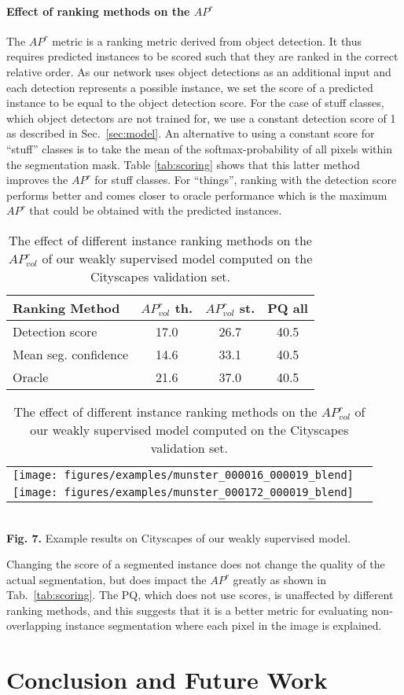 \documentclass[runningheads]{llncs}
\begin{document}
\paragraph{Effect of ranking methods on the $AP^{r}$}
The $AP^{r}$ metric is a ranking metric derived from object detection.
It thus requires predicted instances to be scored such that they are ranked in the correct relative order.
As our network uses object detections as an additional input and each detection represents a possible instance, we set the score of a predicted instance to be equal to the object detection score.
For the case of stuff classes, which object detectors are not trained for, we use a constant detection score of 1 as described in Sec.~\ref{sec:model}.
An alternative to using a constant score for ``stuff'' classes is to take the mean of the softmax-probability of all pixels within the segmentation mask.
Table \ref{tab:scoring} shows that this latter method improves the $AP^r$ for stuff classes.
For ``things'', ranking with the detection score performs better and comes closer to oracle performance which is the maximum $AP^r$ that could be obtained with the predicted instances.

\begin{table}[t]
	\parbox{.48\linewidth}{

	\caption{The effect of different instance ranking methods on the $AP^{r}_{vol}$ of our weakly supervised model computed on the Cityscapes validation set.}
	\label{tab:scoring}
	\begin{tabularx}{1\linewidth}{Xccc}
		\toprule
		Ranking Method          & $AP^{r}_{vol}$ th. & $AP^{r}_{vol}$ st. & PQ all \\ \midrule
		Detection score         & 17.0      & 26.7     & 40.5   \\
		Mean seg. confidence & 14.6      & 33.1     & 40.5   \\
		Oracle                  & 21.6      & 37.0     & 40.5   \\ \bottomrule
	\end{tabularx}

	}
	\hfill
	\parbox{.48\linewidth}{
			\centering
			\label{my-label}
			\begin{tabular}{cc}
				\texttt{[image: figures/examples/munster\_000016\_000019\_blend]} \\
				\texttt{[image: figures/examples/munster\_000172\_000019\_blend]}
			\end{tabular}
			\\
			\textbf{Fig. 7.} Example results on Cityscapes of our weakly supervised model.
	}
\end{table} 
Changing the score of a segmented instance does not change the quality of the actual segmentation, but does impact the $AP^r$ greatly as shown in Tab.~\ref{tab:scoring}.
The PQ, which does not use scores, is unaffected by different ranking methods, and this suggests that it is a better metric for evaluating non-overlapping instance segmentation where each pixel in the image is explained. \section{Conclusion and Future Work}
\end{document}

